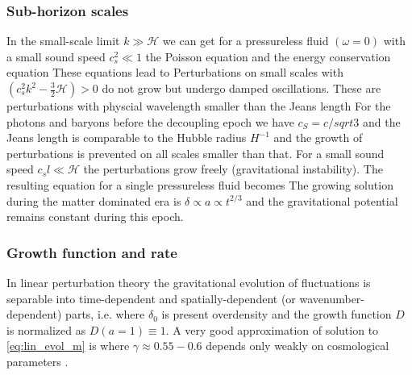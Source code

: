 \subsubsection{Sub-horizon scales}
In the small-scale limit $k\gg\mathcal{H}$ we can get for a pressureless fluid $(\omega=0)$ with a small sound speed $c_s^2\ll1$ the Poisson equation
and the energy conservation equation
These equations lead to
Perturbations on small scales with $(c_s^2k^2-\frac32\mathcal{H})>0$ do not grow but undergo damped oscillations. These are perturbations with physcial wavelength smaller than the Jeans length
For the photons and baryons before the decoupling epoch we have $c_S=c/sqrt3$ and the Jeans length is comparable to the Hubble radius $H^{-1}$ and the growth of perturbations is prevented on all scales smaller than that. For a small sound speed $c_sl\ll\mathcal{H}$ the perturbations grow freely (gravitational instability). The resulting equation for a single pressureless fluid becomes
The growing solution during the matter dominated era is $\delta\propto a\propto t^{2/3}$ and the gravitational potential remains constant during this epoch.

\subsubsection{Growth function and rate}
In linear perturbation theory the gravitational evolution of fluctuations is separable into time-dependent and spatially-dependent (or wavenumber-dependent) parts, i.e.
where $\delta_0$ is present overdensity and the growth function $D$ is normalized as $D(a=1)\equiv1$. A very good approximation of solution to \autoref{eq:lin_evol_m} is
where $\gamma\approx0.55-0.6$ depends only weakly on cosmological parameters \parencite{1980_Peebles}.

